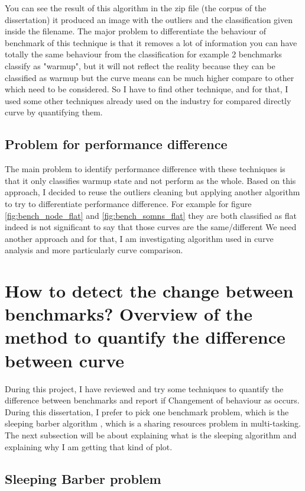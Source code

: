\documentclass{article}
\begin{document}
You can see the result of this algorithm in the zip file (the corpus of the dissertation) it produced an image with the outliers and the classification given inside the filename.
The major problem to differentiate the behaviour of benchmark of this technique is that it removes a lot of information you can have totally the same behaviour from the classification for example 2 benchmarks classify as "warmup", but it will not reflect the reality because they can be classified as warmup but the curve means can be much higher compare to other which need to be considered. So I have to find other technique, and for that, I used some other techniques already used on the industry for compared directly curve by quantifying them.



\subsection{Problem for performance difference}

The main problem to identify performance difference with these techniques is that it only classifies warmup state and not perform as the whole. Based on this approach, I decided to reuse the outliers cleaning but applying another algorithm to try to differentiate performance difference. For example for figure \ref{fig:bench_node_flat} and \ref{fig:bench_somns_flat} they are both classified as flat indeed is not significant to say that those curves are the same/different We need another approach and for that, I am investigating algorithm used in curve analysis and more particularly curve comparison.




\section{ How to detect the change between benchmarks? Overview of the method to quantify the difference between curve}

During this project, I have reviewed and try some techniques to quantify the difference between benchmarks and report if Changement of behaviour as occurs. During this dissertation, I prefer to pick one benchmark problem, which is the sleeping barber algorithm \citep{reynolds2002linda}, which is a sharing resources problem in multi-tasking. The next subsection will be about explaining what is the sleeping algorithm and explaining why I am getting that kind of plot.

\subsection{Sleeping Barber problem}
\end{document}
